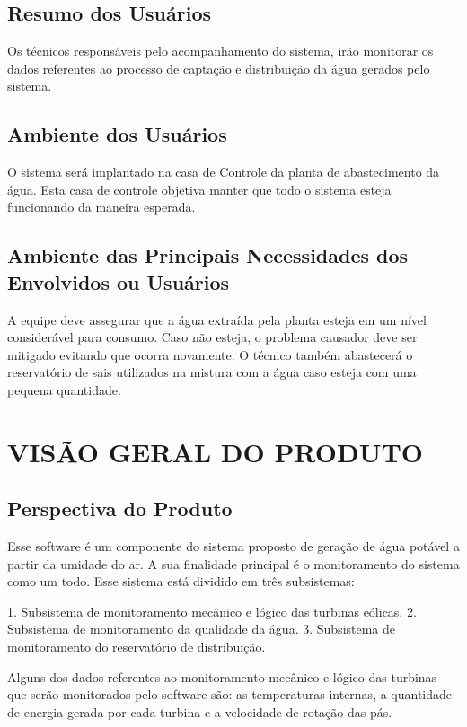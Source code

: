   \subsection{Resumo dos Usuários}
  Os técnicos responsáveis pelo acompanhamento do sistema, irão monitorar os dados referentes ao  processo de captação e 
  distribuição da água gerados pelo sistema.
  
  \subsection{Ambiente dos Usuários}
  O sistema será implantado na casa  de Controle da planta de abastecimento da água. Esta casa de controle objetiva manter que 
  todo o sistema esteja funcionando da maneira esperada.
  
  \subsection{Ambiente das Principais Necessidades dos Envolvidos ou Usuários}
  A equipe deve assegurar que a água extraída pela planta esteja em um nível considerável para consumo. Caso não esteja, o 
  problema causador deve ser mitigado evitando que ocorra novamente. O técnico também abastecerá o reservatório de sais 
  utilizados na mistura com a água caso esteja com uma pequena quantidade.
  
  \section{VISÃO GERAL DO PRODUTO}
  
  \subsection{Perspectiva do Produto}
  Esse software é um componente do sistema proposto de geração de água potável a partir da umidade do ar. A sua finalidade 
  principal é o monitoramento do sistema como um todo. Esse sistema está dividido em três subsistemas: 
  
  1. Subsistema de monitoramento mecânico e lógico das turbinas eólicas.
  2. Subsistema de monitoramento da qualidade da água.
  3. Subsistema de monitoramento do reservatório de distribuição.
  
  Alguns dos dados referentes ao monitoramento mecânico e lógico das turbinas que serão monitorados pelo software são: as temperaturas 
  internas, a quantidade de energia gerada por cada turbina e a velocidade de rotação das pás. 
  

